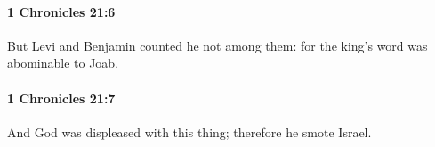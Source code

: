 		\paragraph{1 Chronicles 21:6} %
			\label{1CHRONICLES-21-6}

			But Levi and Benjamin counted he not among them: for the king’s word was abominable to Joab.


		\paragraph{1 Chronicles 21:7} %
			\label{1CHRONICLES-21-7}

			And God was displeased with this thing; therefore he smote Israel.


